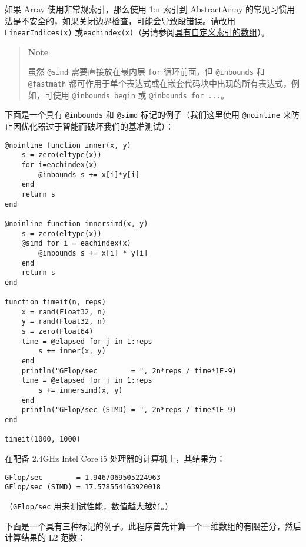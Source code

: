 如果 Array 使用非常规索引，那么使用 1:n 索引到 AbstractArray 的常见习惯用法是不安全的，如果关闭边界检查，可能会导致段错误。请改用\texttt{LinearIndices(x)} 或\texttt{eachindex(x)}（另请参阅\hyperlink{1238988360302116626}{具有自定义索引的数组}）。



\begin{quote}
\textbf{Note}

虽然 \texttt{@simd} 需要直接放在最内层 \texttt{for} 循环前面，但 \texttt{@inbounds} 和 \texttt{@fastmath} 都可作用于单个表达式或在嵌套代码块中出现的所有表达式，例如，可使用 \texttt{@inbounds begin} 或 \texttt{@inbounds for ...}。

\end{quote}


下面是一个具有 \texttt{@inbounds} 和 \texttt{@simd} 标记的例子（我们这里使用 \texttt{@noinline} 来防止因优化器过于智能而破坏我们的基准测试）：




\begin{verbatim}
@noinline function inner(x, y)
    s = zero(eltype(x))
    for i=eachindex(x)
        @inbounds s += x[i]*y[i]
    end
    return s
end

@noinline function innersimd(x, y)
    s = zero(eltype(x))
    @simd for i = eachindex(x)
        @inbounds s += x[i] * y[i]
    end
    return s
end

function timeit(n, reps)
    x = rand(Float32, n)
    y = rand(Float32, n)
    s = zero(Float64)
    time = @elapsed for j in 1:reps
        s += inner(x, y)
    end
    println("GFlop/sec        = ", 2n*reps / time*1E-9)
    time = @elapsed for j in 1:reps
        s += innersimd(x, y)
    end
    println("GFlop/sec (SIMD) = ", 2n*reps / time*1E-9)
end

timeit(1000, 1000)
\end{verbatim}



在配备 2.4GHz Intel Core i5 处理器的计算机上，其结果为：




\begin{lstlisting}
GFlop/sec        = 1.9467069505224963
GFlop/sec (SIMD) = 17.578554163920018
\end{lstlisting}



（\texttt{GFlop/sec} 用来测试性能，数值越大越好。）



下面是一个具有三种标记的例子。此程序首先计算一个一维数组的有限差分，然后计算结果的 L2 范数：




